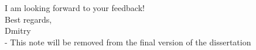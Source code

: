 \begin{tcolorbox}[title=Note to the committee]
    I am looking forward to your feedback!\\
    Best regards,\\
    Dmitry\\

    {\scriptsize - This note will be removed from the final version of the dissertation}
\end{tcolorbox}
